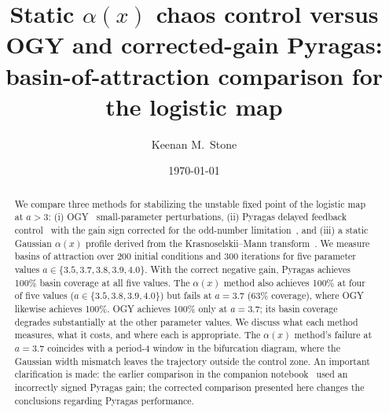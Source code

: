 \documentclass[aps,pre,twocolumn,superscriptaddress,nofootinbib,
               longbibliography,floatfix]{revtex4-2}
\newcommand{\KM}{Krasnoselskii--Mann}
\begin{document}

\title{Static $\alpha(x)$ chaos control versus OGY and
       corrected-gain Pyragas: basin-of-attraction comparison
       for the logistic map}

\author{Keenan M.~Stone}

\date{\today}

\begin{abstract}
We compare three methods for stabilizing the unstable fixed
point of the logistic map at $a > 3$:
(i) OGY~\cite{OttGrebogiYorke1990} small-parameter perturbations,
(ii) Pyragas delayed feedback control~\cite{Pyragas1992} with
     the gain sign corrected for the odd-number
     limitation~\cite{Nakajima1997,JustEtAl1997},
and
(iii) a static Gaussian $\alpha(x)$ profile derived from the
     \mbox{\KM} transform~\cite{DysonPaper,PetrificationRepo}.
We measure basins of attraction over 200 initial conditions
and 300 iterations for five parameter values
$a \in \{3.5, 3.7, 3.8, 3.9, 4.0\}$.
With the correct negative gain, Pyragas achieves 100\% basin
coverage at all five values.
The $\alpha(x)$ method also achieves 100\% at four of five
values ($a \in \{3.5, 3.8, 3.9, 4.0\}$) but fails at $a = 3.7$
(63\% coverage), where OGY likewise achieves 100\%.
OGY achieves 100\% only at $a = 3.7$; its basin coverage
degrades substantially at the other parameter values.
We discuss what each method measures, what it costs, and where
each is appropriate.  The $\alpha(x)$ method's failure at
$a = 3.7$ coincides with a period-4 window in the bifurcation
diagram, where the Gaussian width mismatch leaves the trajectory
outside the control zone.  An important clarification is made:
the earlier comparison in the companion
notebook~\cite{PetrificationRepo} used an incorrectly signed
Pyragas gain; the corrected comparison presented here changes
the conclusions regarding Pyragas performance.
\end{abstract}


\maketitle

\end{document}
